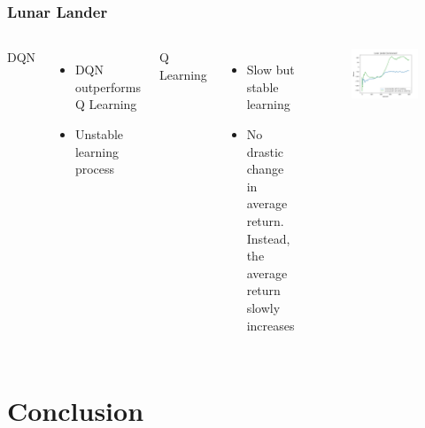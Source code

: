 \documentclass{beamer}
\begin{document}
\begin{frame}
    \frametitle{Lunar Lander}

    \begin{columns}
        DQN \pause
        \begin{itemize}
            \item DQN outperforms Q Learning \pause
            \item Unstable learning process \pause
        \end{itemize}
        Q Learning \pause
        \begin{itemize}
            \item Slow but stable learning \pause
            \item No drastic change in average return. Instead, the average return slowly
                  increases
        \end{itemize}
        \begin{figure}[H]
            \centering
            \includegraphics[width=\textwidth]{../plots/lunar}
        \end{figure}
    \end{columns}

\end{frame}

\section{Conclusion}
\end{document}
